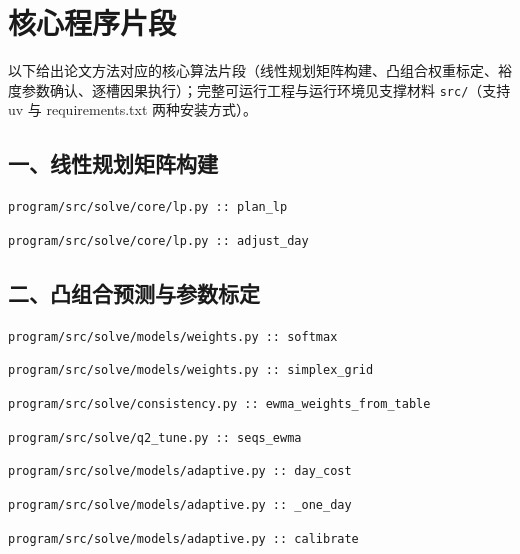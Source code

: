 \lstset{language=Python,basicstyle=\ttfamily\scriptsize,numbers=left,
  numberstyle=\tiny,breaklines=true,breakatwhitespace=false,
  columns=flexible,keepspaces=true,showstringspaces=false,tabsize=4,frame=none}
\section{核心程序片段}
以下给出论文方法对应的核心算法片段（线性规划矩阵构建、凸组合权重标定、裕度参数确认、逐槽因果执行）；完整可运行工程与运行环境见支撑材料 \texttt{src/}（支持 uv 与 requirements.txt 两种安装方式）。
\subsection*{一、线性规划矩阵构建}
\noindent\texttt{program/src/solve/core/lp.py :: plan\_lp}\par

\noindent\texttt{program/src/solve/core/lp.py :: adjust\_day}\par

\subsection*{二、凸组合预测与参数标定}
\noindent\texttt{program/src/solve/models/weights.py :: softmax}\par

\noindent\texttt{program/src/solve/models/weights.py :: simplex\_grid}\par

\noindent\texttt{program/src/solve/consistency.py :: ewma\_weights\_from\_table}\par

\noindent\texttt{program/src/solve/q2\_tune.py :: seqs\_ewma}\par

\noindent\texttt{program/src/solve/models/adaptive.py :: day\_cost}\par

\noindent\texttt{program/src/solve/models/adaptive.py :: \_one\_day}\par

\noindent\texttt{program/src/solve/models/adaptive.py :: calibrate}\par

